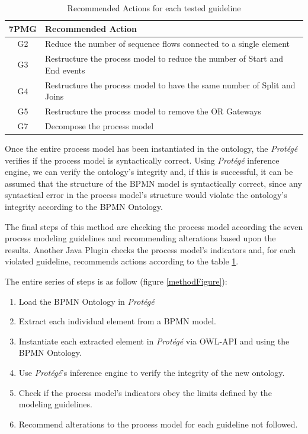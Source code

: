 \documentclass[a4paper,twoside]{article}
\begin{document}
\begin{table}[]
	\centering
	\caption{Recommended Actions for each tested guideline}
	\label{RecommendedActions}
	\begin{tabular}{|c|p{5.5cm}|}
		\hline
		7PMG & Recommended Action \\ \hline
		G2 & Reduce the number of sequence flows connected to a single element \\ \hline
		G3 & Restructure the process model to reduce the number of Start and End events \\ \hline
		G4 & Restructure the process model to have the same number of Split and Joins \\ \hline
		G5 & Restructure the process model to remove the OR Gateways \\ \hline
		G7 & Decompose the process model \\ \hline
	\end{tabular}
\end{table}

Once the entire process model has been instantiated in the ontology, the \textit{Protégé}  verifies if the process model is syntactically correct.  Using \textit{Protégé} inference engine, we can verify the ontology's integrity and, if this is successful, it can be assumed that the structure of the BPMN model is syntactically correct, since any syntactical error in the process model's structure would violate the ontology's integrity according to the BPMN Ontology.

The final steps of this method are checking the process model according the seven process modeling guidelines and recommending alterations based upon the results. Another Java Plugin checks the process model's indicators and, for each violated guideline, recommends actions according to the table \ref{RecommendedActions}.

The entire series of steps is as follow (figure \ref{methodFigure}):

\begin{enumerate}
	\item Load the BPMN Ontology in \textit{Protégé}
	\item Extract each individual element from a BPMN model.
	\item Instantiate each extracted element in \textit{Protégé} via OWL-API and using the BPMN Ontology.
	\item Use \textit{Protégé}'s inference engine to verify the integrity of the new ontology.
	\item Check if the process model's indicators obey the limits defined by the modeling guidelines.
	\item Recommend alterations to the process model for each guideline not followed.
\end{enumerate}
\end{document}
